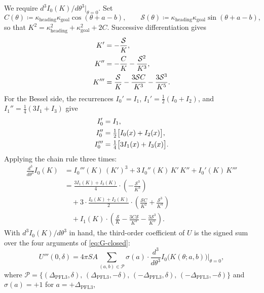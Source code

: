\documentclass[11pt, a4paper]{article}
\newcommand{\kh}{\kappa_{\mathrm{heading}}}
\newcommand{\kg}{\kappa_{\mathrm{goal}}}
\newcommand{\Dp}{\Delta_{\mathrm{PFL3}}}
\begin{document}
We require $d^3 I_0(K)/d\theta^3\big|_{\theta=0}$.  Set
\begin{equation}
C(\theta) \coloneqq \kh\kg\cos(\theta + a - b),
\qquad
\mathcal{S}(\theta) \coloneqq \kh\kg\sin(\theta + a - b),
\end{equation}
so that $K^2 = \kh^2 + \kg^2 + 2C$.  Successive differentiation gives
%
\begin{align}
K'   &= -\frac{\mathcal{S}}{K}, \notag\\
K''  &= -\frac{C}{K} - \frac{\mathcal{S}^2}{K^3}, \notag\\
K''' &= \frac{\mathcal{S}}{K} - \frac{3\mathcal{S}C}{K^3} - \frac{3\mathcal{S}^3}{K^5}.
\label{eq:Kderivs}
\end{align}
%
For the Bessel side, the recurrences $I_0' = I_1$, $I_1' = \tfrac{1}{2}(I_0 +
I_2)$, and $I_1'' = \tfrac{1}{4}(3I_1 + I_3)$ give
%
\begin{align}
I_0'   &= I_1, \notag\\
I_0''  &= \tfrac{1}{2}\bigl[I_0(x) + I_2(x)\bigr], \notag\\
I_0''' &= \tfrac{1}{4}\bigl[3I_1(x) + I_3(x)\bigr].
\label{eq:Iderivs}
\end{align}
%
Applying the chain rule three times:
%
\begin{equation}
\label{eq:d3I0}
\begin{aligned}
\frac{d^3}{d\theta^3} I_0(K)
  &= I_0'''(K)\,(K')^3
   + 3\,I_0''(K)\,K'\,K''
   + I_0'(K)\,K''' \\
  &= \frac{3I_1(K)+I_3(K)}{4}
     \cdot\left(-\frac{\mathcal{S}^3}{K^3}\right) \\
  &\quad
   + 3 \cdot \frac{I_0(K)+I_2(K)}{2}
     \cdot\left(\frac{\mathcal{S}C}{K^2} + \frac{\mathcal{S}^3}{K^4}\right) \\
  &\quad
   + I_1(K)
     \cdot\left(\frac{\mathcal{S}}{K} - \frac{3C\mathcal{S}}{K^3}
                - \frac{3\mathcal{S}^3}{K^5}\right).
\end{aligned}
\end{equation}
%
With $d^3 I_0(K)/d\theta^3$ in hand, the third-order coefficient of $U$ is the
signed sum over the four arguments of \cref{eq:G-closed}:
%
\begin{equation}
\label{eq:U-triple-prime}
U'''(0, \delta)
  = 4\pi SA
    \sum_{(a,b) \in \mathcal{P}}
    \sigma(a) \cdot
    \frac{d^3}{d\theta^3} I_0\bigl(K(\theta; a, b)\bigr)\Bigr|_{\theta=0},
\tag{16}
\end{equation}
%
where $\mathcal{P} = \{(\Dp,\delta),\, (\Dp,-\delta),\,
(-\Dp,\delta),\, (-\Dp,-\delta)\}$ and $\sigma(a) = +1$ for $a = +\Dp$,
\end{document}
